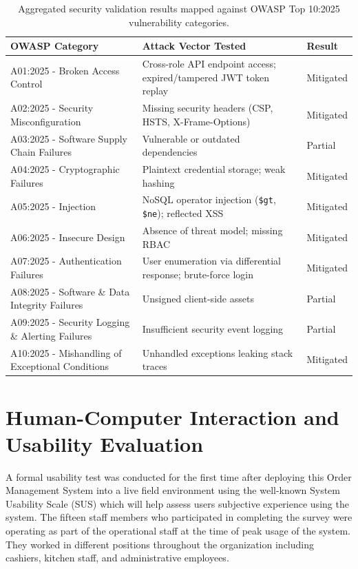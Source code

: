 \begin{table}[htbp]
\centering
\small
\begin{tabular}{|p{3.8cm}|p{5.5cm}|p{1.8cm}|}
\hline
\textbf{OWASP Category} & \textbf{Attack Vector Tested} & \textbf{Result} \\ \hline
A01:2025 - Broken Access Control & Cross-role API endpoint access; expired/tampered JWT token replay & Mitigated \\ \hline
A02:2025 - Security Misconfiguration & Missing security headers (CSP, HSTS, X-Frame-Options) & Mitigated \\ \hline
A03:2025 - Software Supply Chain Failures & Vulnerable or outdated dependencies & Partial \\ \hline
A04:2025 - Cryptographic Failures & Plaintext credential storage; weak hashing & Mitigated \\ \hline
A05:2025 - Injection & NoSQL operator injection (\texttt{\$gt}, \texttt{\$ne}); reflected XSS & Mitigated \\ \hline
A06:2025 - Insecure Design & Absence of threat model; missing RBAC & Mitigated \\ \hline
A07:2025 - Authentication Failures & User enumeration via differential response; brute-force login & Mitigated \\ \hline
A08:2025 - Software \& Data Integrity Failures & Unsigned client-side assets & Partial \\ \hline
A09:2025 - Security Logging \& Alerting Failures & Insufficient security event logging & Partial \\ \hline
A10:2025 - Mishandling of Exceptional Conditions & Unhandled exceptions leaking stack traces & Mitigated \\ \hline
\end{tabular}
\caption{Aggregated security validation results mapped against OWASP Top 10:2025 vulnerability categories.}
\label{tab:security_results}
\end{table}

\section{Human-Computer Interaction and Usability Evaluation}
\label{sec:usability}
A formal usability test was conducted for the first time after deploying this Order Management System into a live field environment using the well-known System Usability Scale (SUS)\cite{brooke1996sus} which will help assess users subjective experience using the system. The fifteen staff members who participated in completing the survey were operating as part of the operational staff at the time of peak usage of the system. They worked in different positions throughout the organization including cashiers, kitchen staff, and administrative employees.

